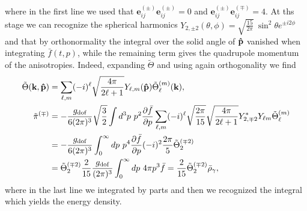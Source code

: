 where in the first line we used that $\boldsymbol{e}_{ij}^{(\pm)}\boldsymbol{e}_{ij}^{(\pm)}=0$ and $\boldsymbol{e}_{ij}^{(\pm)}\boldsymbol{e}_{ij}^{(\mp)}=4$. At ths stage we can recognize the spherical harmonics $Y_{2,\pm2}(\theta,\phi)=\sqrt{\frac{15}{2\pi}}\ \sin^2\theta e^{\pm i2\phi}$ and that by orthonormality the integral over the solid angle of $\mathbf{\hat{p}}$ vanished when integrating $\bar f(t,p)$, while the remaining term gives the quadrupole momentum of the anisotropies. Indeed, expanding $\tilde \Theta$ and using again orthogonality we find
\begin{align*}
    \tilde{\Theta}(\mathbf{k},\versor p)&=\sum_{\ell,m}(-i)^{\ell}\sqrt{\frac{4\pi}{2\ell+1}}Y_{\ell, m}(\versor p)\tilde\Theta_{\ell}^{(m)}(\mathbf k),\\
    \tilde \pi^{(\mp)}&=-\frac{g_\text{dof}}{6(2\pi)^3}\sqrt{\frac32}\int d^3p\ p^2 \frac{\partial\bar f}{\partial p}\sum_{\ell,m}(-i)^{\ell}\sqrt{\frac{2\pi}{15}}\sqrt{\frac{4\pi}{2\ell+1}}Y_{2,\mp2}^*Y_{\ell m}\tilde\Theta_{\ell}^{(m)}\\
    &=-\frac{g_\text{dof}}{6(2\pi)^3}\int_0^\infty dp\ p^4 \frac{\partial\bar f}{\partial p}(-i)^{2}\frac{2\pi}{5}\tilde\Theta_{2}^{(\mp2)}\\
    &=\tilde\Theta_{2}^{(\mp2)}\frac{2}{15}\frac{g_\text{dof}}{(2\pi)^3}\int_0^\infty dp\ 4\pi p^3 \bar f=\frac{2}{15}\tilde\Theta_2^{(\mp2)}\bar\rho_\gamma,
\end{align*}
where in the last line we integrated by parts and then we recognized the integral which yields the energy density.


